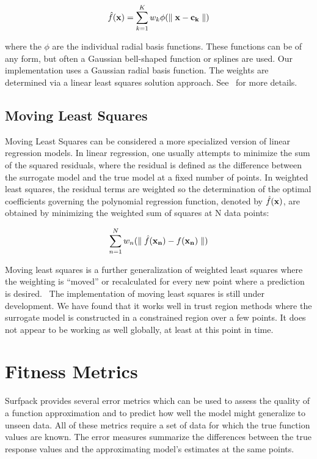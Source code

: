 \documentclass{article}
\begin{document}
\begin{equation}
  \hat{f}({\bf x})=\sum_{k=1}^{K}w_{k}\phi({\parallel {\bf x} - {\bf c_{k}} \parallel})
  \label{models:surf:equation11}  
\end{equation}

where the $\phi$ are the individual radial basis functions.  
These functions can be of any form, but often a Gaussian bell-shaped 
function or splines are used.  
Our implementation uses a Gaussian radial basis function. 
The weights are determined via a linear least squares solution approach.
See~\cite{orr} for more details.

\subsection{Moving Least Squares}\label{models:surf:mls}

Moving Least Squares can be considered a more specialized 
version of linear regression models.  In linear regression, 
one usually attempts to minimize the sum of the squared residuals, 
where the residual is defined as the difference between the 
surrogate model and the true model at a fixed number of points. 
In weighted least squares, the residual terms are weighted so the 
determination of the optimal coefficients governing the polynomial 
regression function, denoted by $\hat{f}({\bf x})$, are obtained by 
minimizing the weighted sum of squares at N data points: 

\begin{equation}
  \sum_{n=1}^{N}w_{n}({\parallel \hat{f}({\bf x_{n}})-f({\bf x_{n}})\parallel})
  \label{models:surf:equation12}  
\end{equation}

Moving least squares is a further generalization of weighted least squares
where the weighting is ``moved'' or recalculated for every new point where 
a prediction is desired.~\cite{nealen}  The implementation of 
moving least squares 
is still under development.  We have found that it works well 
in trust region methods where the surrogate model is constructed in 
a constrained region over a few points.  It does not appear to be working 
as well globally, at least at this point in time.

\section{Fitness Metrics}
Surfpack provides several error metrics which can be used to assess
the quality of a function approximation and to predict how well the
model might generalize to unseen data.  All of these metrics require a
set of data for which the true function values are known.  The error
measures summarize the differences between the true response values
and the approximating model's estimates at the same points.
\end{document}
